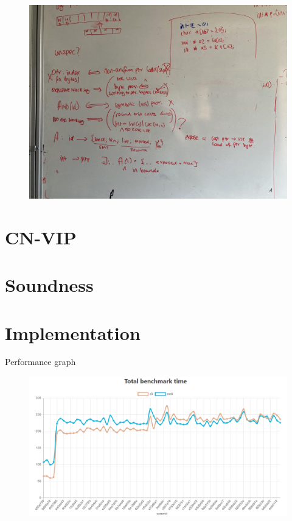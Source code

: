 \begin{figure}[h]
    \centering
    \includegraphics[width=\textwidth]{../misc/type-system-options.jpg}
\end{figure}

\section{CN-VIP}\label{sec:cn-vip}

\section{Soundness}\label{sec:cn-vip-soundness}

\section{Implementation}

Performance graph

\begin{figure}[h]
    \centering
    \includegraphics[width=\textwidth]{../misc/vip-performance-hit.png}
\end{figure}

